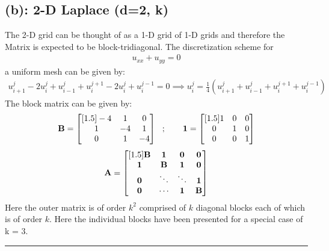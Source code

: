 \subsection*{(b): 2-D Laplace (d=2, k)}
The 2-D grid can be thought of as a 1-D grid of 1-D grids and therefore the Matrix is expected to be block-tridiagonal. The discretization scheme for  
\begin{align*}
u_{xx}
+ 
u_{yy}
=
0
\end{align*}
a uniform mesh can be given by:
\begin{align*}
u^j_{i+1} - 2u^j_{i} + u^j_{i-1}
+ 
u^{j+1}_{i} - 2u^j_{i} + u^{j-1}_{i}
=
0 \implies u^j_i = \frac{1}{4} \left( u^j_{i+1} +  u^j_{i-1} + u^{j+1}_{i} + u^{j-1}_{i}
\right)
\end{align*}
The block matrix can be given by: 
\begin{align*}
{\bf B} = \begin{bmatrix}[1.5]
-4 & 1 & 0 \\
1 & -4 & 1 \\
0 & 1 & -4
\end{bmatrix} \ \ ; \ \ \ \ \ \ 
{\bf 1} 
=
\begin{bmatrix}[1.5]
1 & 0 & 0\\
0 & 1 & 0\\
0 & 0 & 1
\end{bmatrix}
\end{align*}
\begin{align*}
{\bf A} = \begin{bmatrix}[1.5]
{\bf B}  & {\bf 1} & \bf 0 & \bf 0\\
{\bf 1} & {\bf B} & {\bf 1} & \bf 0\\
\bf 0 & \ddots & \ddots & {\bf 1}\\
\bf 0 & \cdots & {\bf 1} & {\bf B}
\end{bmatrix}
\end{align*}
Here the outer matrix is of order $k^2$ comprised of $k$ diagonal blocks each of which is of order $k$. Here the individual blocks have been presented for a special case of k = 3.\\
\hrule
